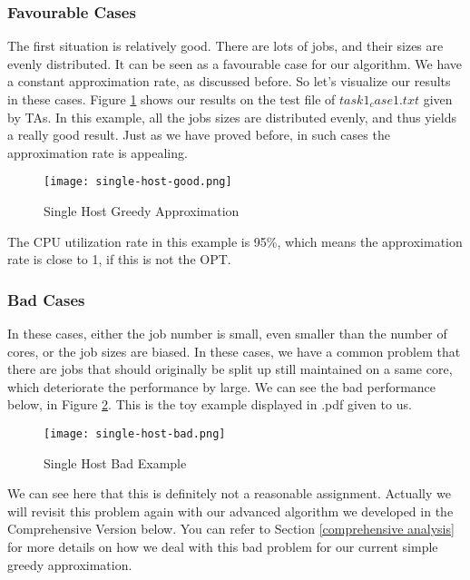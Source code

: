 \documentclass{article}
\begin{document}
    \subsubsection{Favourable Cases}
    The first situation is relatively good. There are lots of jobs, and their sizes are evenly distributed.
    It can be seen as a favourable case for our algorithm. We have a constant approximation rate, as discussed before. So let's visualize our results in these cases. Figure \ref{single-host-good} shows our results on the test file of $task1_case1.txt$ given by TAs. In this example, all the jobs sizes are distributed evenly, and thus yields a really good result. Just as we have proved before, in such cases the approximation rate is appealing.
    
    \begin{figure}[H]
        \centering
        \texttt{[image: single-host-good.png]}
        \caption{Single Host Greedy Approximation}
        \label{single-host-good}
    \end{figure}
    
    The CPU utilization rate in this example is 95\%, which means the approximation rate is close to 1, if this is not the OPT.

    \subsubsection{Bad Cases}
    In these cases, either the job number is small, even smaller than the number of cores, or the job sizes are biased. In these cases, we have a common problem that there are jobs that should originally be split up still maintained on a same core, which deteriorate the performance by large. We can see the bad performance below, in Figure \ref{single-host-bad}. This is the toy example displayed in .pdf given to us.
    
    \begin{figure}[H]
        \centering
        \texttt{[image: single-host-bad.png]}
        \caption{Single Host Bad Example}
        \label{single-host-bad}
    \end{figure}

We can see here that this is definitely not a reasonable assignment. Actually we will revisit this problem again with our advanced algorithm we developed in the Comprehensive Version below. You can refer to Section \ref{comprehensive analysis} for more details on how we deal with this bad problem for our current simple greedy approximation.
\end{document}
